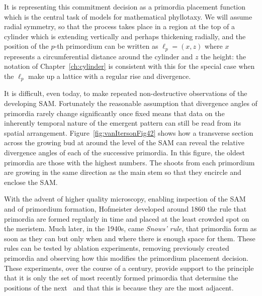 It is representing this commitment decision as a primordia placement function which is the central task of models for mathematical phyllotaxy. We will assume radial symmetry, so that the process takes place in a region at the top of a cylinder which is extending vertically and perhaps thickening radially, and the position of the $p$-th primordium can be written as $\ell_p=(x,z)$ where $x$ represents a circumferential distance around the cylinder and $z$ the height: the notation of Chapter~\ref{ch:cylinder} is consistent with this for the special case when the $\ell_p$ make up a lattice with a regular rise and divergence. 

It is difficult, even today, to make repeated non-destructive observations of the developing SAM. Fortunately the reasonable assumption that divergence angles of primordia rarely change significantly once fixed means that data on the inherently temporal nature of the emergent pattern can still be read from its spatial arrangement.
Figure~\ref{fig:vanItersonFig42} shows how a transverse section across the growing bud at around the level of the SAM can reveal the relative divergence angles of each of the successive primordia. In this figure, the oldest primordia are those with the highest numbers. The shoots from each primordium are growing in the same direction as the main stem so that they encircle and enclose the SAM. 
 
With the advent of higher quality microscopy, enabling inspection of the SAM and of primordium formation,  Hofmeister developed around 1860 the rule  that primordia are formed regularly in time and placed at the least crowded spot on the meristem. Much later, in the 1940s, came \emph{Snows' rule}, that primordia form as soon as they can but only when and where there is enough space for them.%
 These rules can be tested by ablation experiments, removing previously created primordia and observing how this modifies the primordium placement decision. These experiments, over the course of a century, provide support to the principle that it is only the set of most recently formed primordia that determine the positions of the next~\autocite{snowExperimentsPhyllotaxisII1933,reinhardtRegulationPhyllotaxisPolar2003} and that this is because they are the most adjacent. 
 
